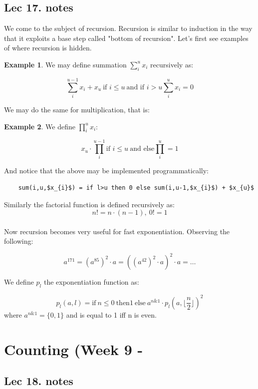\documentclass[titlepage]{article}
\theoremstyle{definition}
\newcommand{\floor}[1]{\lfloor #1 \rfloor}
\newtheorem{example}{Example}
\numberwithin{equation}{subsection}
\numberwithin{remark}{subsection}
\begin{document}
\subsection{Lec 17. notes}
We come to the subject of recursion. Recursion is similar to induction in the way that it exploits a base step called "bottom of recursion". Let's first see examples of where recursion is hidden. 

\begin{example}
We may define summation $\sum_{i}^{u} x_{i}$ recursively as:

$$ \sum_{i}^{u-1} x_{i} + x_{u} \ \text{if $i \leq u$} \ \text{and if $i > u$} \sum_{i}^{u} x_{i} = 0$$
\end{example}

We may do the same for multiplication, that is:

\begin{example}
We define $\prod_{i}^{u} x_{i} $: 

$$ x_{u} \cdot \prod_{i}^{u-1}  \text{if $i\leq u$} \ \text{and else} \prod_{i}^{u} = 1$$
\end{example}

And notice that the above may be implemented programmatically:

\begin{lstlisting}
    sum(i,u,$x_{i}$) = if l>u then 0 else sum(i,u-1,$x_{i}$) + $x_{u}$
\end{lstlisting}

Similarly the factorial function is defined recursively as:
$$n! = n \cdot (n-1), \ 0!=1$$
\\

Now recursion becomes very useful for fast exponentiation. Observing the following:

$$ a^{171} = (a^{85})^{2} \cdot a = ((a^{42})^{2}\cdot a)^{2} \cdot a = \ldots$$

We define $p_{l}$ the exponentiation function as:

$$ p_{l}(a,l) = \text{if} \ n\leq 0 \ \text{then} 1\ \text{else} \ a^{n\text{&}1}\cdot p_{l}(a,\floor{\frac{n}{2}})^{2}$$ where $a^{n\text{&}1} = \{0,1\}$ and is equal to 1 iff n is even. 

\section{Counting (Week 9 -}
\subsection{Lec 18. notes}
\end{document}
